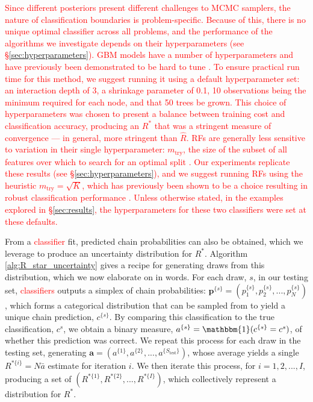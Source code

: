 \documentclass{article}
\begin{document}
\textcolor{red}{Since different posteriors present different challenges to MCMC samplers, the nature of classification boundaries is problem-specific. Because of this, there is no unique optimal classifier across all problems, and the performance of the algorithms we investigate depends on their hyperparameters (see \S\ref{sec:hyperparameters}). GBM models have a number of hyperparameters and have previously been demonstrated to be hard to tune \cite[Chapter~12]{boehmke2019hands}. To ensure practical run time for this method, we suggest running it using a default hyperparameter set: an interaction depth of 3, a shrinkage parameter of 0.1, 10 observations being the minimum required for each node, and that 50 trees be grown. This choice of hyperparameters was chosen to present a balance between training cost and classification accuracy, producing an $R^*$  that was a stringent measure of convergence — in general, more stringent than $\widehat{R}$. RFs are generally less sensitive to variation in their single hyperparameter: $m_{\text{try}}$, the size of the subset of all features over which to search for an optimal split \cite[Chapter~11]{boehmke2019hands}. Our experiments replicate these results (see \S\ref{sec:hyperparameters}), and we suggest running RFs using the heuristic $m_{\text{try}}=\sqrt{K}$, which has previously been shown to be a choice resulting in robust classification performance \citep{bernard2009influence,boehmke2019hands}. Unless otherwise stated, in the examples explored in \S\ref{sec:results}, the hyperparameters for these two classifiers were set at these defaults.}

From a \textcolor{red}{classifier} fit, predicted chain probabilities can also be obtained, which we leverage to produce an uncertainty distribution for $R^*$. Algorithm \ref{alg:R_star_uncertainty} gives a recipe for generating draws from this distribution, which we now elaborate on in words. For each draw, $s$, in our testing set, \textcolor{red}{classifiers} outputs a simplex of chain probabilities: $\boldsymbol{p}^{\{s\}}=(p_1^{\{s\}},p_2^{\{s\}},...,p_N^{\{s\}})$, which forms a categorical distribution that can be sampled from to yield a unique chain prediction, $c^{\{s\}}$. By comparing this classification to the true classification, $c^s$, we obtain a binary measure, $a^{\{s\}}=\mathbbm{1}(c^{\{s\}}=c^s)$, of whether this prediction was correct. We repeat this process for each draw in the testing set, generating $\boldsymbol{a}=(a^{\{1\}},a^{\{2\}},...,a^{\{S_\text{test}\}})$, whose average yields a single $R^{*\{i\}}=N \bar{a}$ estimate for iteration $i$. We then iterate this process, for $i=1,2,...,I$, producing a set of $(R^{*\{1\}},R^{*\{2\}},...,R^{*\{I\}})$, which collectively represent a distribution for $R^*$. 
\end{document}
